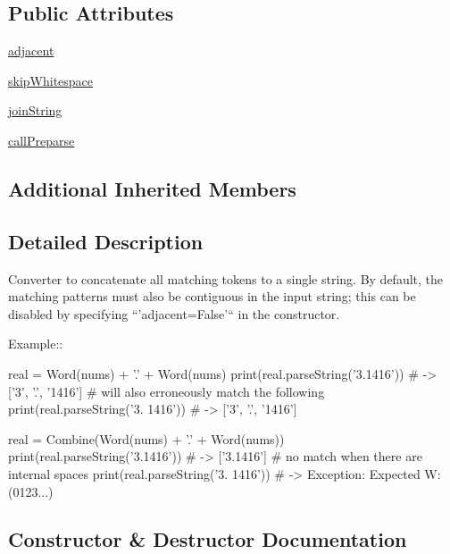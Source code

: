 \subsection*{Public Attributes}
\begin{DoxyCompactItemize}
\item 
\hyperlink{classpip_1_1__vendor_1_1pyparsing_1_1Combine_ab2a725e5ca77b07bf7ce08028fa863e8}{adjacent}
\item 
\hyperlink{classpip_1_1__vendor_1_1pyparsing_1_1Combine_a54d0ecbf4343411706a60a750cd4bf41}{skip\+Whitespace}
\item 
\hyperlink{classpip_1_1__vendor_1_1pyparsing_1_1Combine_ab5a6bba58ca69cd1fca48a09cca161f1}{join\+String}
\item 
\hyperlink{classpip_1_1__vendor_1_1pyparsing_1_1Combine_a225a534f9da0520438f99b0ea8c388e8}{call\+Preparse}
\end{DoxyCompactItemize}
\subsection*{Additional Inherited Members}


\subsection{Detailed Description}
\begin{DoxyVerb}Converter to concatenate all matching tokens to a single string.
By default, the matching patterns must also be contiguous in the
input string; this can be disabled by specifying
``'adjacent=False'`` in the constructor.

Example::

    real = Word(nums) + '.' + Word(nums)
    print(real.parseString('3.1416')) # -> ['3', '.', '1416']
    # will also erroneously match the following
    print(real.parseString('3. 1416')) # -> ['3', '.', '1416']

    real = Combine(Word(nums) + '.' + Word(nums))
    print(real.parseString('3.1416')) # -> ['3.1416']
    # no match when there are internal spaces
    print(real.parseString('3. 1416')) # -> Exception: Expected W:(0123...)
\end{DoxyVerb}
 

\subsection{Constructor \& Destructor Documentation}
\mbox{\label{classpip_1_1__vendor_1_1pyparsing_1_1Combine_a405256dc18913b78cb734d63a1760f82}} 
